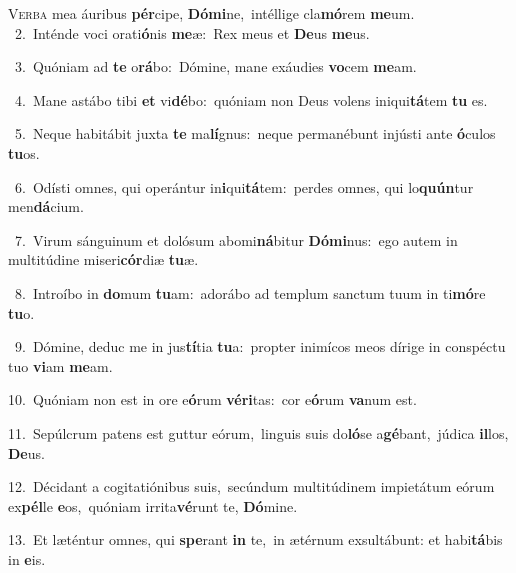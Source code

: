 \lettrine{\initial\textcolor{\initialcolor}{V}}{erba} mea áuribus \textbf{pér}\-cipe, \textbf{Dó}\-\textbf{mi}ne,~\star intéllige cla\-\textbf{mó}\-rem \textbf{me}\-um.\\
{\numbfont\textcolor{\numbcolor}{~2.}}~Inténde voci orati\-\textbf{ó}\-nis \textbf{me}\-æ:~\star Rex meus et \textbf{De}\-us \textbf{me}\-us.\par
{\numbfont\textcolor{\numbcolor}{~3.}}~Quóniam ad \textbf{te} o\-\textbf{rá}\-bo:~\star Dómine, mane exáudies \textbf{vo}\-cem \textbf{me}\-am.\par
{\numbfont\textcolor{\numbcolor}{~4.}}~Mane astábo tibi \textbf{et} vi\-\textbf{dé}\-bo:~\star quóniam non Deus volens iniqui\-\textbf{tá}\-tem \textbf{tu} es.\par
{\numbfont\textcolor{\numbcolor}{~5.}}~Neque habitábit juxta \textbf{te} ma\-\textbf{lí}\-gnus:~\star neque permanébunt injústi ante \textbf{ó}\-culos \textbf{tu}\-os.\par
{\numbfont\textcolor{\numbcolor}{~6.}}~Odísti omnes, qui operántur in\-\textbf{i}\-qui\-\textbf{tá}\-tem:~\star perdes omnes, qui lo\-\textbf{quún}\-tur men\-\textbf{dá}\-cium.\par
{\numbfont\textcolor{\numbcolor}{~7.}}~Virum sánguinum et dolósum abomi\-\textbf{ná}\-bitur \textbf{Dó}\-\textbf{mi}nus:~\star ego autem in multitúdine miseri\-\textbf{cór}\-diæ \textbf{tu}\-æ.\par
{\numbfont\textcolor{\numbcolor}{~8.}}~Introíbo in \textbf{do}\-mum \textbf{tu}\-am:~\star adorábo ad templum sanctum tuum in ti\-\textbf{mó}\-re \textbf{tu}\-o.\par
{\numbfont\textcolor{\numbcolor}{~9.}}~Dómine, deduc me in jus\-\textbf{tí}\-tia \textbf{tu}\-a:~\star propter inimícos meos dírige in conspéctu tuo \textbf{vi}\-am \textbf{me}\-am.\par
{\numbfont\textcolor{\numbcolor}{10.}}~Quóniam non est in ore e\-\textbf{ó}\-rum \textbf{vé}\-\textbf{ri}tas:~\star cor e\-\textbf{ó}\-rum \textbf{va}\-num est.\par
{\numbfont\textcolor{\numbcolor}{11.}}~Sepúlcrum patens est guttur eórum,~\dagger linguis suis do\-\textbf{ló}\-se a\-\textbf{gé}\-bant,~\star júdica \textbf{il}\-los, \textbf{De}\-us.\par
{\numbfont\textcolor{\numbcolor}{12.}}~Décidant a cogitatiónibus suis,~\dagger secúndum multitúdinem impietátum eórum ex\-\textbf{pél}\-le \textbf{e}\-os,~\star quóniam irrita\-\textbf{vé}\-runt te, \textbf{Dó}\-mine.\par
{\numbfont\textcolor{\numbcolor}{13.}}~Et læténtur omnes, qui \textbf{spe}\-rant \textbf{in} te,~\star in ætérnum exsultábunt: et habi\-\textbf{tá}\-bis in \textbf{e}\-is.\par
